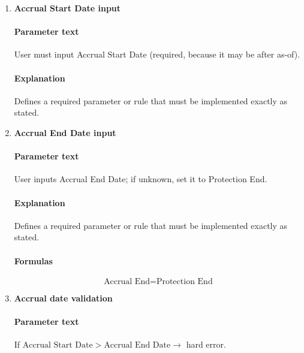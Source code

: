 \documentclass[11pt]{article}
\begin{document}
\begin{enumerate}[label=\arabic*),leftmargin=*,align=left]
\paragraph{Parameter text} We do not assume/compute past accrual. 
\paragraph{Explanation} Defines a required parameter or rule that must be implemented exactly as stated.
\paragraph{Formulas} Accrual in valuation starts at:
\[ t_{\text{start,eff}} = \max(\text{as-of date}, \text{Accrual Start Date}) \]

\item \textbf{Accrual Start Date input}
\paragraph{Parameter text} User must input Accrual Start Date (required, because it may be after as-of).
\paragraph{Explanation} Defines a required parameter or rule that must be implemented exactly as stated.

\item \textbf{Accrual End Date input}
\paragraph{Parameter text} User inputs Accrual End Date; if unknown, set it to Protection End.
\paragraph{Explanation} Defines a required parameter or rule that must be implemented exactly as stated.
\paragraph{Formulas} 
\[ \text{Accrual End} = \text{Protection End} \]

\item \textbf{Accrual date validation}
\paragraph{Parameter text} If $\text{Accrual Start Date} > \text{Accrual End Date} \rightarrow$ hard error.

\end{enumerate}
\end{document}
